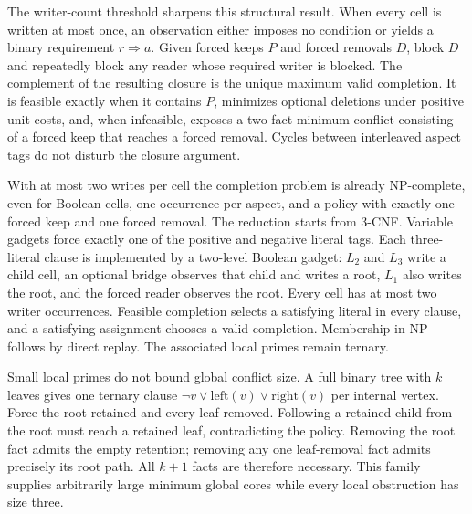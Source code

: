 The writer-count threshold sharpens this structural result.  When every cell is
written at most once, an observation either imposes no condition or yields a binary
requirement $r\Rightarrow a$.  Given forced keeps $P$ and forced removals $D$, block
$D$ and repeatedly block any reader whose required writer is blocked.  The complement
of the resulting closure is the unique maximum valid completion.  It is feasible
exactly when it contains $P$, minimizes optional deletions under positive unit costs,
and, when infeasible, exposes a two-fact minimum conflict consisting of a forced keep
that reaches a forced removal.  Cycles between interleaved aspect tags do not disturb
the closure argument.

With at most two writes per cell the completion problem is already NP-complete, even
for Boolean cells, one occurrence per aspect, and a policy with exactly one forced
keep and one forced removal.  The reduction starts from 3-CNF.  Variable gadgets
force exactly one of the positive and negative literal tags.  Each three-literal
clause is implemented by a two-level Boolean gadget: $L_2$ and $L_3$ write a child
cell, an optional bridge observes that child and writes a root, $L_1$ also writes the
root, and the forced reader observes the root.  Every cell has at most two writer
occurrences.  Feasible completion selects a satisfying literal in every clause, and
a satisfying assignment chooses a valid completion.  Membership in NP follows by
direct replay.  The associated local primes remain ternary.

Small local primes do not bound global conflict size.  A full binary tree with
$k$ leaves gives one ternary clause
$\neg v\lor\mathrm{left}(v)\lor\mathrm{right}(v)$ per internal vertex.  Force the
root retained and every leaf removed.  Following a retained child from the root must
reach a retained leaf, contradicting the policy.  Removing the root fact admits the
empty retention; removing any one leaf-removal fact admits precisely its root path.
All $k+1$ facts are therefore necessary.  This family supplies arbitrarily large
minimum global cores while every local obstruction has size three.

